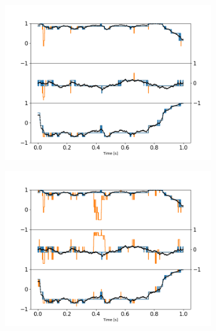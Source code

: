 \begin{figure}[h!]
	\centering
	\begin{subfigure}{0.32\textwidth}
		\subcaption{}
		\includegraphics[width=\textwidth]{fig11a.png}
	\end{subfigure}
	\begin{subfigure}{0.32\textwidth}
		\subcaption{}
		\includegraphics[width=\textwidth]{fig11b.png}
	\end{subfigure}
	\begin{subfigure}{0.32\textwidth}
		\subcaption{}

\end{subfigure}
\end{figure}
